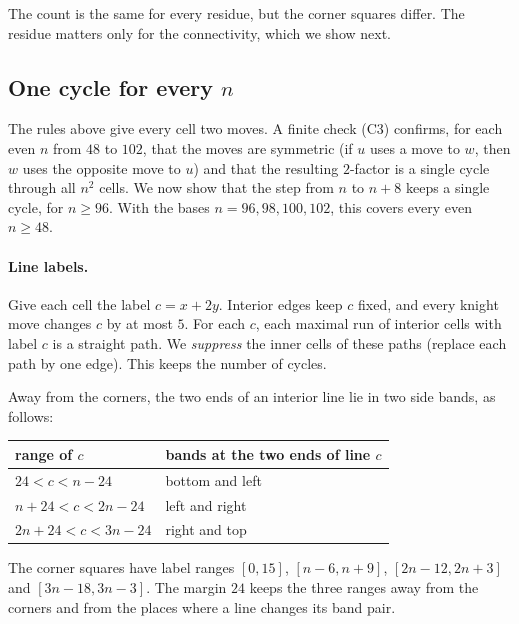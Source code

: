 \documentclass[11pt]{article}
\theoremstyle{definition}
\theoremstyle{remark}
\begin{document}
The count is the same for every residue, but the corner squares differ.
The residue matters only for the connectivity, which we show next.

\subsection{One cycle for every \texorpdfstring{$n$}{n}}\label{sec:onecycle}

The rules above give every cell two moves.
A finite check (C3) confirms, for each even $n$ from $48$ to $102$, that the moves are symmetric (if $u$ uses a move to $w$, then $w$ uses the opposite move to $u$) and that the resulting $2$-factor is a single cycle through all $n^2$ cells.
We now show that the step from $n$ to $n+8$ keeps a single cycle, for $n\ge96$.
With the bases $n=96,98,100,102$, this covers every even $n\ge 48$.

\paragraph{Line labels.}
Give each cell the label $c=x+2y$.
Interior edges keep $c$ fixed, and every knight move changes $c$ by at most $5$.
For each $c$, each maximal run of interior cells with label $c$ is a straight path.
We \emph{suppress} the inner cells of these paths (replace each path by one edge).
This keeps the number of cycles.

Away from the corners, the two ends of an interior line lie in two side bands, as follows:
\begin{center}
\begin{tabular}{ll}
\toprule
range of $c$ & bands at the two ends of line $c$\\\midrule
$24<c<n-24$ & bottom and left\\
$n+24<c<2n-24$ & left and right\\
$2n+24<c<3n-24$ & right and top\\\bottomrule
\end{tabular}
\end{center}
The corner squares have label ranges $[0,15]$, $[n-6,n+9]$, $[2n-12,2n+3]$ and $[3n-18,3n-3]$.
The margin $24$ keeps the three ranges away from the corners and from the places where a line changes its band pair.
\end{document}
